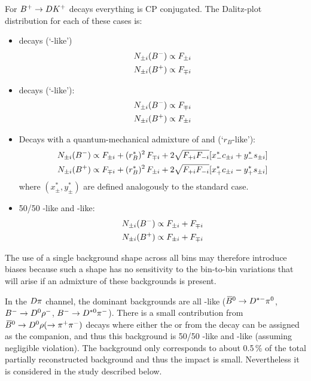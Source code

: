 For ${{{B}^+}}\rightarrow DK^+$ decays everything is CP conjugated. The Dalitz-plot distribution for each of these cases is:
\begin{itemize}
\item \Dz decays (`\Dz-like')
\begin{align}
\begin{split}
N_{\pm i}({{{B}^-}}) & \propto F_{\pm i} \label{eq:nD0} \\
N_{\pm i}({{{B}^+}}) & \propto F_{\mp i}
\end{split}
\end{align}
\item \Dzb decays (`\Dzb-like'):
\begin{align}{}
\begin{split}
N_{\pm i}({{{B}^-}}) & \propto F_{\mp i} \\
N_{\pm i}({{{B}^+}}) & \propto F_{\pm i}
\end{split}
\end{align}
\item Decays with a quantum-mechanical admixture of \Dz and \Dzb (`$r_B$-like'):
\begin{align}
\begin{split}
N_{\pm i}({{{B}^-}}) & \propto F_{\pm i} + (r_{B}^{*})^2\,F_{\mp i} + 2\sqrt{F_{+i}F_{-i}}[x_{-}^{*}c_{\pm i} + y_{-}^{*}s_{\pm i}] \\
N_{\pm i}({{{B}^+}}) & \propto F_{\mp i} + (r_{B}^{*})^2\,F_{\pm i} + 2\sqrt{F_{+i}F_{-i}}[x_{+}^{*}c_{\pm i} - y_{+}^{*}s_{\pm i}] \label{eq:nrB} 
\end{split}
\end{align}
where $(x_{\pm}^{*},y_{\pm}^{*})$ are defined analogously to the standard \BtoDK case.

\item 50/50 \Dz-like and \Dzb-like:
\begin{align}
\begin{split}
N_{\pm i}({{{B}^-}}) & \propto F_{\pm i} + F_{\mp i}  \\
N_{\pm i}({{{B}^+}}) & \propto F_{\pm i} + F_{\mp i}  \label{eq:n5050} 
\end{split}
\end{align}
\end{itemize}
The use of a single background shape across all bins may therefore introduce biases because such a shape has no sensitivity to the bin-to-bin variations that will arise if an  admixture of these backgrounds is present. 

In the ${D}\pi$ channel, the dominant backgrounds are all \Dz-like (${{\kern 0.18em\overline{\kern -0.18em B}}{}^0}\rightarrow{\ensuremath{{D}^{*-}}}{\ensuremath{{\pi}^0}}$, ${{{B}^-}}\rightarrow{\ensuremath{{D}^0}}\rho^-$, ${{{B}^-}}\rightarrow{\ensuremath{{D}^{*0}}}{\ensuremath{{\pi}^-}}$). There is a small contribution from ${{{\kern 0.18em\overline{\kern -0.18em B}}{}^0}\rightarrow{\ensuremath{{D}^0}}\rho(\rightarrow{\ensuremath{{\pi}^+}}{\ensuremath{{\pi}^-}})}$ decays where either the \pip or \pim from the \rhoz decay can be assigned as the companion, and thus this background is 50/50 \Dz-like and \Dzb-like (assuming negligible \CP violation). The background only corresponds to about 0.5\,\% of the total partially reconstructed background and thus the impact is small. Nevertheless it is considered in the study described below.

